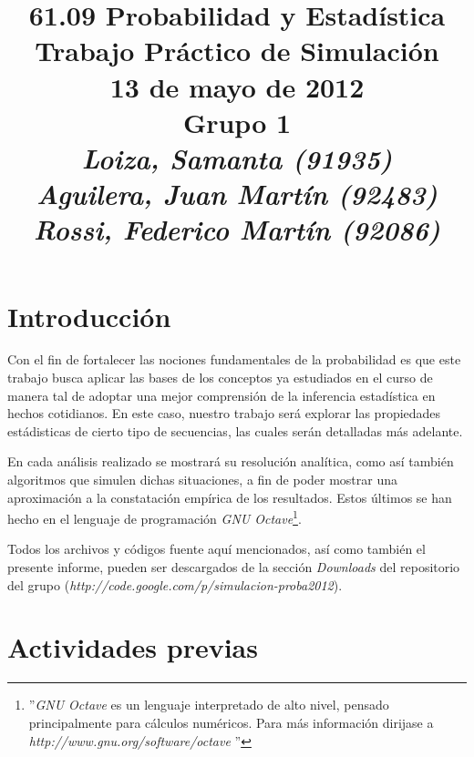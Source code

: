 \documentclass{article}
\begin{document}
\title{\huge 61.09 Probabilidad y Estadística \\ 
	  \Huge Trabajo Práctico de Simulación \\
	  \bigskip \Large 13 de mayo de 2012 \\
	  \bigskip \large \textbf{Grupo 1} \\
	  \large \textit{Loiza, Samanta (91935)\\Aguilera, Juan Martín (92483)\\Rossi, Federico Martín (92086)}}
\date{}
\maketitle



\section{Introducción}

	Con el fin de fortalecer las nociones fundamentales de la probabilidad es que este trabajo busca aplicar las bases de los conceptos ya estudiados en el curso de manera tal de adoptar una mejor comprensión de la inferencia estadística en hechos cotidianos. En este caso, nuestro trabajo será explorar las propiedades estádisticas de cierto tipo de secuencias, las cuales serán detalladas más adelante.
	\par 
	En cada análisis realizado se mostrará su resolución analítica, como así también algoritmos que simulen dichas situaciones, a fin de poder mostrar una aproximación a la constatación empírica de los resultados. Estos últimos se han hecho en el lenguaje de programación \textit{GNU Octave}\footnote{''\textit{GNU Octave} es un lenguaje interpretado de alto nivel, pensado principalmente para cálculos numéricos. Para más información dirijase a \textit{http://www.gnu.org/software/octave} ''}.
	\par 
	Todos los archivos y códigos fuente aquí mencionados, así como también el presente informe, pueden ser descargados de la sección \textit{Downloads} del repositorio del grupo (\textit{http://code.google.com/p/simulacion-proba2012}).



\section{Actividades previas}
\end{document}
